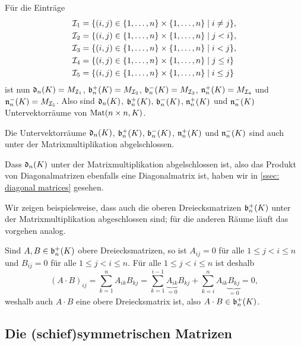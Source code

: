 Für die Einträge
\begin{align*}
 \mathcal{I}_1 &= \{(i,j) \in \{1, \dotsc, n\} \times \{1, \dotsc, n\} \mid i \neq j\}, \\
 \mathcal{I}_2 &= \{(i,j) \in \{1, \dotsc, n\} \times \{1, \dotsc, n\} \mid j < i\}, \\
 \mathcal{I}_3 &= \{(i,j) \in \{1, \dotsc, n\} \times \{1, \dotsc, n\} \mid i < j\}, \\
 \mathcal{I}_4 &= \{(i,j) \in \{1, \dotsc, n\} \times \{1, \dotsc, n\} \mid j \leq i\} \\
 \mathcal{I}_5 &= \{(i,j) \in \{1, \dotsc, n\} \times \{1, \dotsc, n\} \mid i \leq j\}
\end{align*}
ist nun $\mathfrak{d}_n(K) = M_{\mathcal{I}_1}$, $\mathfrak{b}^+_n(K) = M_{\mathcal{I}_2}$, $\mathfrak{b}^-_n(K) = M_{\mathcal{I}_3}$, $\mathfrak{n}^+_n(K) = M_{\mathcal{I}_4}$ und $\mathfrak{n}^-_n(K) = M_{\mathcal{I}_5}$. Also sind $\mathfrak{d}_n(K)$, $\mathfrak{b}^+_n(K)$, $\mathfrak{b}^-_n(K)$, $\mathfrak{n}^+_n(K)$ und $\mathfrak{n}^-_n(K)$ Untervektorräume von $\mathrm{Mat}(n \times n, K)$.

\begin{bem}
 Die Untervektorräume $\mathfrak{d}_n(K)$, $\mathfrak{b}^+_n(K)$, $\mathfrak{b}^-_n(K)$, $\mathfrak{n}^+_n(K)$ und $\mathfrak{n}^-_n(K)$ sind auch unter der Matrixmultiplikation abgelschlossen.
 
 Dass $\mathfrak{d}_n(K)$ unter der Matrixmultiplikation abgelschlossen ist, also das Produkt von Diagonalmatrizen ebenfalls eine Diagonalmatrix ist, haben wir in \ref{ssec: diagonal matrices} gesehen.
 
 Wir zeigen beispielsweise, dass auch die oberen Dreiecksmatrizen $\mathfrak{b}^+_n(K)$ unter der Matrixmultiplikation abgeschlossen sind; für die anderen Räume läuft das vorgehen analog.
 
 Sind $A, B \in \mathfrak{b}^+_n(K)$ obere Dreiecksmatrizen, so ist $A_{ij} = 0$ für alle $1 \leq j < i \leq n$ und $B_{ij} = 0$ für alle $1 \leq j < i \leq n$. Für alle $1 \leq j < i \leq n$ ist deshalb
 \[
  (A \cdot B)_{ij}
  = \sum_{k=1}^n A_{ik} B_{kj}
  = \sum_{k=1}^{i-1} \underbrace{A_{ik}}_{=0} B_{kj} + \sum_{k=i}^n A_{ik} \underbrace{B_{kj}}_{=0}
  = 0,
 \]
 weshalb auch $A \cdot B$ eine obere Dreiecksmatrix ist, also $A \cdot B \in \mathfrak{b}^+_n(K)$.
\end{bem}



\subsection{Die (schief)symmetrischen Matrizen}


